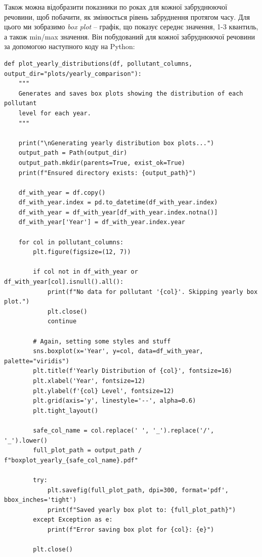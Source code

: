 \documentclass{exam_template}
\begin{document}
Також можна відобразити показники по роках для кожної забруднюючої речовини, щоб
побачити, як змінюється рівень забруднення протягом часу. Для цього ми зобразимо
\textit{box plot} – графік, що показує середнє значення, 1-3 квантиль, а також
min/max значення. Він побудований для кожної забруднюючої речовини за допомогою 
наступного коду на Python:
\begin{verbatim}
def plot_yearly_distributions(df, pollutant_columns, output_dir="plots/yearly_comparison"):
    """
    Generates and saves box plots showing the distribution of each pollutant
    level for each year.
    """
    
    print("\nGenerating yearly distribution box plots...")
    output_path = Path(output_dir)
    output_path.mkdir(parents=True, exist_ok=True)
    print(f"Ensured directory exists: {output_path}")

    df_with_year = df.copy()
    df_with_year.index = pd.to_datetime(df_with_year.index)
    df_with_year = df_with_year[df_with_year.index.notna()]
    df_with_year['Year'] = df_with_year.index.year

    for col in pollutant_columns:
        plt.figure(figsize=(12, 7))

        if col not in df_with_year or df_with_year[col].isnull().all():
            print(f"No data for pollutant '{col}'. Skipping yearly box plot.")
            plt.close()
            continue

        # Again, setting some styles and stuff
        sns.boxplot(x='Year', y=col, data=df_with_year, palette="viridis")
        plt.title(f'Yearly Distribution of {col}', fontsize=16)
        plt.xlabel('Year', fontsize=12)
        plt.ylabel(f'{col} Level', fontsize=12)
        plt.grid(axis='y', linestyle='--', alpha=0.6)
        plt.tight_layout()

        safe_col_name = col.replace(' ', '_').replace('/', '_').lower()
        full_plot_path = output_path / f"boxplot_yearly_{safe_col_name}.pdf"

        try:
            plt.savefig(full_plot_path, dpi=300, format='pdf', bbox_inches='tight')
            print(f"Saved yearly box plot to: {full_plot_path}")
        except Exception as e:
            print(f"Error saving box plot for {col}: {e}")

        plt.close()
\end{verbatim}
\end{document}
